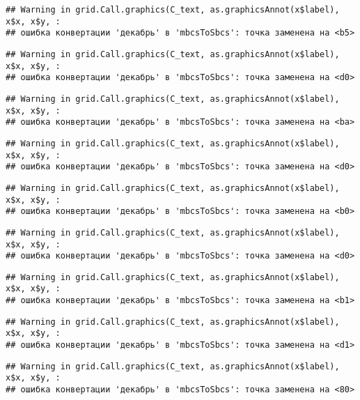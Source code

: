 \documentclass[
]{article}
\begin{document}
\begin{verbatim}
## Warning in grid.Call.graphics(C_text, as.graphicsAnnot(x$label), x$x, x$y, :
## ошибка конвертации 'декабрь' в 'mbcsToSbcs': точка заменена на <b5>
\end{verbatim}

\begin{verbatim}
## Warning in grid.Call.graphics(C_text, as.graphicsAnnot(x$label), x$x, x$y, :
## ошибка конвертации 'декабрь' в 'mbcsToSbcs': точка заменена на <d0>
\end{verbatim}

\begin{verbatim}
## Warning in grid.Call.graphics(C_text, as.graphicsAnnot(x$label), x$x, x$y, :
## ошибка конвертации 'декабрь' в 'mbcsToSbcs': точка заменена на <ba>
\end{verbatim}

\begin{verbatim}
## Warning in grid.Call.graphics(C_text, as.graphicsAnnot(x$label), x$x, x$y, :
## ошибка конвертации 'декабрь' в 'mbcsToSbcs': точка заменена на <d0>
\end{verbatim}

\begin{verbatim}
## Warning in grid.Call.graphics(C_text, as.graphicsAnnot(x$label), x$x, x$y, :
## ошибка конвертации 'декабрь' в 'mbcsToSbcs': точка заменена на <b0>
\end{verbatim}

\begin{verbatim}
## Warning in grid.Call.graphics(C_text, as.graphicsAnnot(x$label), x$x, x$y, :
## ошибка конвертации 'декабрь' в 'mbcsToSbcs': точка заменена на <d0>
\end{verbatim}

\begin{verbatim}
## Warning in grid.Call.graphics(C_text, as.graphicsAnnot(x$label), x$x, x$y, :
## ошибка конвертации 'декабрь' в 'mbcsToSbcs': точка заменена на <b1>
\end{verbatim}

\begin{verbatim}
## Warning in grid.Call.graphics(C_text, as.graphicsAnnot(x$label), x$x, x$y, :
## ошибка конвертации 'декабрь' в 'mbcsToSbcs': точка заменена на <d1>
\end{verbatim}

\begin{verbatim}
## Warning in grid.Call.graphics(C_text, as.graphicsAnnot(x$label), x$x, x$y, :
## ошибка конвертации 'декабрь' в 'mbcsToSbcs': точка заменена на <80>
\end{verbatim}
\end{document}
